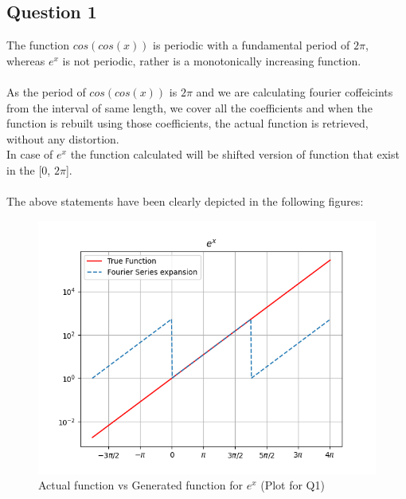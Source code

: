 \documentclass[11pt, a4paper]{article}
\begin{document}
	   \subsection{Question 1}
           The function $cos(cos(x))$ is periodic with a fundamental period of ${2\pi}$, whereas $e^x$ is not periodic, rather is a monotonically increasing function.\\
           \\As the period of $cos(cos(x))$ is ${2\pi}$ and we are calculating fourier coffeicints from the interval of same length, we cover all the coefficients and when the function is rebuilt using those coefficients, the actual function is retrieved, without any distortion.\\
           In case of $e^x$ the function calculated will be shifted version of function that exist in the [0, ${2\pi}$]. \\
           \\
           The above statements have been clearly depicted in the following figures:            
            \begin{figure}[H]
                \centering
                \includegraphics[scale=0.9]{Figure 1.png}
                \caption{Actual function vs Generated function for $e^x$ (Plot for Q1)}              
            \end{figure}
            
\end{document}
